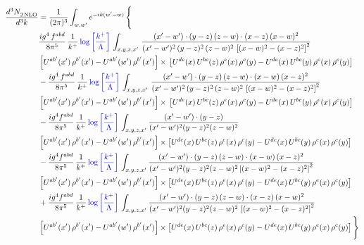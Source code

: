 \documentclass[9pt]{article}
\numberwithin{equation}{section}
\begin{document}
\begin{align}
   \frac{d^{3}N_{2\,\rm NLO}^{\rm}}{d^{3}k}  & = \frac{1}{(2\pi)^{3}}  \int_{w, w^\prime} e^{-ik(w^\prime-w)}\, \Bigg\{\notag \\ &  \frac{ig^{4}\, f^{abd}}{8\pi^{5}}\, \frac{1}{k^{+}}\,{\color{blue}\log{\left[\frac{k^{+}}{\Lambda}\right]}}\, \int_{x,y,z,x'}\,\frac{(x'-w')\cdot  (y-z)\, (z-w)\cdot (x-z)\, (x-w)^{2}}{(x'-w')^{2}\, (y-z)^{2}\, (z-w)^{2}\,\left[(x-w)^{2}-(x-z)^{2}\right]^{2}}\, \notag \\ & \left[U^{ab'}(x')\,\rho^{b'}(x')-U^{ab'}(w')\, \rho^{b'}(x')\right]\times\,\left[U^{de}(x)\,U^{bc}(z)\, \rho^{e}(x)\,\rho^{c}(y)-U^{de}(x)\,U^{bc}(y)\,\rho^{e}(x)\,\rho^{c}(y)\right]\notag \\ &   - \frac{ig^{4}\, f^{abd}}{8\pi^{5}}\, \frac{1}{k^{+}}\,{\color{blue}\log{\left[\frac{k^{+}}{\Lambda}\right]}}\, \int_{x,y,z,x'}\,\frac{(x'-w')\cdot  (y-z)\, (z-w)\cdot (x-w)\, (x-z)^{2}}{(x'-w')^{2}\, (y-z)^{2}\, (z-w)^{2}\,\left[(x-w)^{2}-(x-z)^{2}\right]^{2}}\, \notag \\ & \left[U^{ab'}(x')\,\rho^{b'}(x')-U^{ab'}(w')\, \rho^{b'}(x')\right]\times\,\left[U^{de}(x)\,U^{bc}(z)\, \rho^{e}(x)\,\rho^{c}(y)-U^{de}(x)\,U^{bc}(y)\,\rho^{e}(x)\,\rho^{c}(y)\right]\notag \\ & -\frac{ig^{4}f^{abd}}{8\pi^{5}}\,\frac{1}{k^{+}}\,{\color{blue}\log{\left[\frac{k^{+}}{\Lambda}\right]}}\,\int_{x,y,z,x'}
\frac{(x'-w')\cdot(y-z)}{(x'-w')^{2}(y-z)^{2}(z-w)^{2}}\notag \\ & \left[U^{ab'}(x')\,\rho^{b'}(x')-U^{ab'}(w')\, \rho^{b'}(x')\right]\times \left[U^{de}(x)\,U^{bc}(z)\, \rho^{e}(x)\,\rho^{c}(y)-U^{de}(x)\,U^{bc}(y)\,\rho^{e}(x)\,\rho^{c}(y)\right]\notag \\ & -\frac{ig^{4}f^{abd}}{8\pi^{5}}\,\frac{1}{k^{+}}\,{\color{blue}\log{\left[\frac{k^{+}}{\Lambda}\right]}}\,\int_{x,y,z,x'}
\frac{(x'-w')\cdot(y-z)\,(z-w)\cdot(x-w)\,(x-z)^{2}}{(x'-w')^{2}(y-z)^{2}(z-w)^{2}\left[(x-w)^{2}-(x-z)^{2}\right]^{2}}\notag \\ & \left[U^{ab'}(x')\,\rho^{b'}(x')-U^{ab'}(w')\, \rho^{b'}(x')\right]\times \left[U^{de}(x)\,U^{bc}(z)\, \rho^{e}(x)\,\rho^{c}(y)-U^{de}(x)\,U^{bc}(y)\,\rho^{e}(x)\,\rho^{c}(y)\right]\notag \\ & +\frac{ig^{4}f^{abd}}{8\pi^{5}}\,\frac{1}{k^{+}}\,{\color{blue}\log{\left[\frac{k^{+}}{\Lambda}\right]}}\,\int_{x,y,z,x'}
\frac{(x'-w')\cdot(y-z)\,(z-w)\cdot(x-z)\,(x-w)^{2}}{(x'-w')^{2}(y-z)^{2}(z-w)^{2}\,\left[(x-w)^{2}-(x-z)^{2}\right]^{2}}\notag \\ & \left[U^{ab'}(x')\,\rho^{b'}(x')-U^{ab'}(w')\, \rho^{b'}(x')\right]\times \left[U^{de}(x)\,U^{bc}(z)\, \rho^{e}(x)\,\rho^{c}(y)-U^{de}(x)\,U^{bc}(y)\,\rho^{e}(x)\,\rho^{c}(y)\right]\Bigg\} 
\end{align}   
\end{document}
